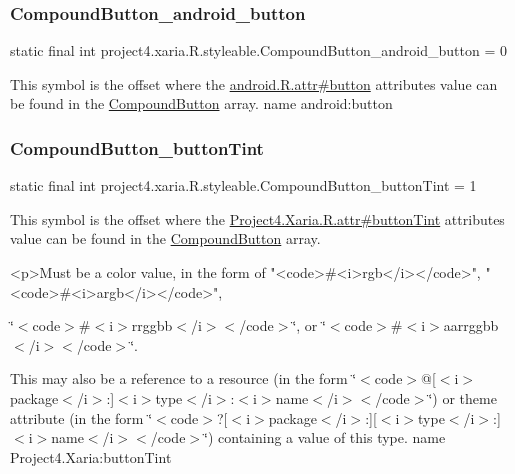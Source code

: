 \subsubsection{\texorpdfstring{Compound\+Button\+\_\+android\+\_\+button}{CompoundButton\_android\_button}}
{\footnotesize\ttfamily static final int project4.\+xaria.\+R.\+styleable.\+Compound\+Button\+\_\+android\+\_\+button = 0\hspace{0.3cm}{\ttfamily [static]}}

This symbol is the offset where the \hyperlink{}{android.\+R.\+attr\#button} attribute\textquotesingle{}s value can be found in the \hyperlink{classproject4_1_1xaria_1_1R_1_1styleable_a1f5b5d01ec9bc3843c12d8e55c052342}{Compound\+Button} array.  name android\+:button \mbox{\label{classproject4_1_1xaria_1_1R_1_1styleable_a2267569338e26b9552f290f79da5b8b0}} 
\subsubsection{\texorpdfstring{Compound\+Button\+\_\+button\+Tint}{CompoundButton\_buttonTint}}
{\footnotesize\ttfamily static final int project4.\+xaria.\+R.\+styleable.\+Compound\+Button\+\_\+button\+Tint = 1\hspace{0.3cm}{\ttfamily [static]}}

This symbol is the offset where the \hyperlink{}{Project4.\+Xaria.\+R.\+attr\#button\+Tint} attribute\textquotesingle{}s value can be found in the \hyperlink{classproject4_1_1xaria_1_1R_1_1styleable_a1f5b5d01ec9bc3843c12d8e55c052342}{Compound\+Button} array.

\begin{DoxyVerb}      <p>Must be a color value, in the form of "<code>#<i>rgb</i></code>", "<code>#<i>argb</i></code>",
\end{DoxyVerb}
 \char`\"{}$<$code$>$\#$<$i$>$rrggbb$<$/i$>$$<$/code$>$\char`\"{}, or \char`\"{}$<$code$>$\#$<$i$>$aarrggbb$<$/i$>$$<$/code$>$\char`\"{}. 

This may also be a reference to a resource (in the form \char`\"{}$<$code$>$@\mbox{[}$<$i$>$package$<$/i$>$\+:\mbox{]}$<$i$>$type$<$/i$>$\+:$<$i$>$name$<$/i$>$$<$/code$>$\char`\"{}) or theme attribute (in the form \char`\"{}$<$code$>$?\mbox{[}$<$i$>$package$<$/i$>$\+:\mbox{]}\mbox{[}$<$i$>$type$<$/i$>$\+:\mbox{]}$<$i$>$name$<$/i$>$$<$/code$>$\char`\"{}) containing a value of this type.  name Project4.\+Xaria\+:button\+Tint \mbox{\label{classproject4_1_1xaria_1_1R_1_1styleable_abfde535b5a5d50cc904acf3e419894fb}} 
